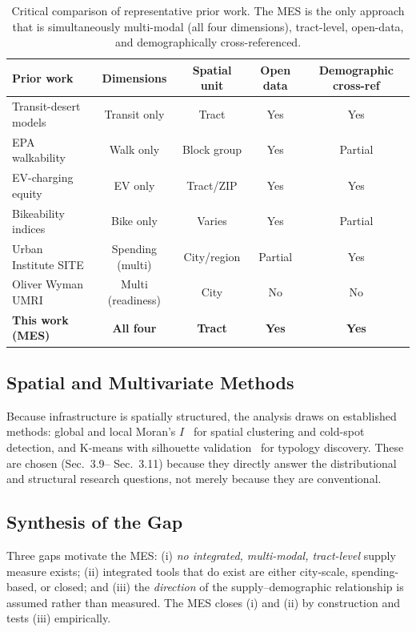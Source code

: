 \documentclass[11pt]{article}
\begin{document}
\begin{table}[htbp]
\centering
\caption{Critical comparison of representative prior work. The MES is the only
approach that is simultaneously multi-modal (all four dimensions), tract-level,
open-data, and demographically cross-referenced.}
\label{tab:gap}
\small
\begin{tabularx}{\textwidth}{l c c c c}
\toprule
\textbf{Prior work} & \textbf{Dimensions} & \textbf{Spatial unit} & \textbf{Open data} & \textbf{Demographic cross-ref} \\
\midrule
Transit-desert models \cite{aman2020,maharjan2024} & Transit only & Tract & Yes & Yes \\
EPA walkability \cite{epa2024,urban2022} & Walk only & Block group & Yes & Partial \\
EV-charging equity \cite{lou2025,chenli2024} & EV only & Tract/ZIP & Yes & Yes \\
Bikeability indices \cite{ahmed2024,albashir2024} & Bike only & Varies & Yes & Partial \\
Urban Institute SITE \cite{urbanSITE2025} & Spending (multi) & City/region & Partial & Yes \\
Oliver Wyman UMRI \cite{oliverwyman2024} & Multi (readiness) & City & No & No \\
\textbf{This work (MES)} & \textbf{All four} & \textbf{Tract} & \textbf{Yes} & \textbf{Yes} \\
\bottomrule
\end{tabularx}
\end{table}

\subsection{Spatial and Multivariate Methods}
Because infrastructure is spatially structured, the analysis draws on established
methods: global and local Moran's $I$~\cite{anselin1995} for spatial clustering
and cold-spot detection, and K-means with silhouette
validation~\cite{rousseeuw1987} for typology discovery. These are chosen (Sec.~3.9--
Sec.~3.11) because they directly answer the distributional and structural research
questions, not merely because they are conventional.

\subsection{Synthesis of the Gap}
Three gaps motivate the MES: (i) \emph{no integrated, multi-modal, tract-level}
supply measure exists; (ii) integrated tools that do exist are either
city-scale, spending-based, or closed; and (iii) the \emph{direction} of the
supply--demographic relationship is assumed rather than measured. The MES closes
(i) and (ii) by construction and tests (iii) empirically.
\end{document}
